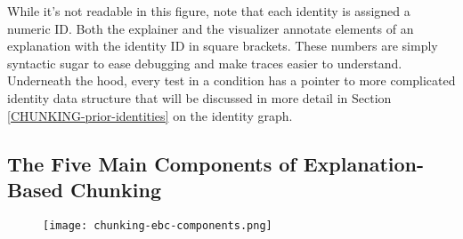 While it's not readable in this figure, note that each identity is assigned a numeric ID.  Both the explainer and the visualizer annotate elements of an explanation with the identity ID in square brackets.  These numbers are simply syntactic sugar to ease debugging and make traces easier to understand.  Underneath the hood, every test in a condition has a pointer to more complicated identity data structure that will be discussed in more detail in Section \ref{CHUNKING-prior-identities} on the identity graph. 


\subsection{The Five Main Components of Explanation-Based Chunking}

\vspace{12pt}
\begin{figure}
	\centering
	\texttt{[image: chunking-ebc-components.png]}
	\label{fig:chunking-ebc-components}
\end{figure}

